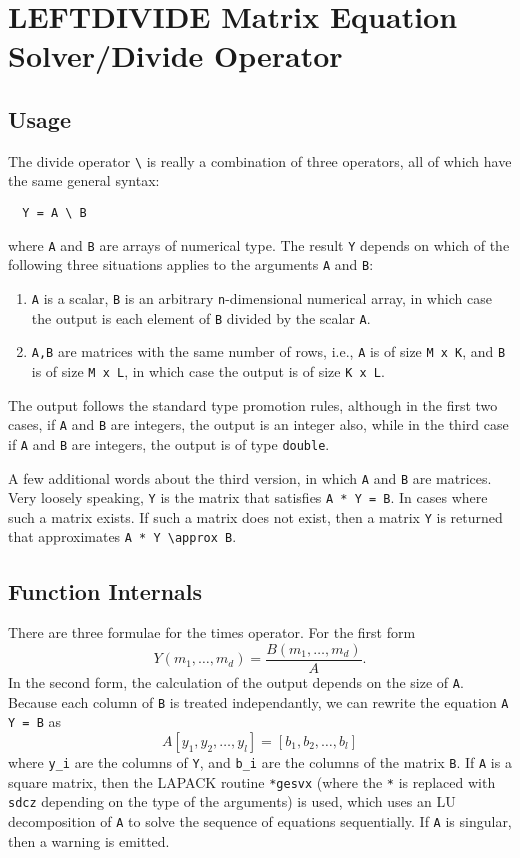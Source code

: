 \section{LEFTDIVIDE Matrix Equation Solver/Divide Operator}

\subsection{Usage}

The divide operator \verb|\| is really a combination of three
operators, all of which have the same general syntax:
\begin{verbatim}
  Y = A \ B
\end{verbatim}
where \verb|A| and \verb|B| are arrays of numerical type.  The result \verb|Y| depends
on which of the following three situations applies to the arguments
\verb|A| and \verb|B|:
\begin{enumerate}
\item  \verb|A| is a scalar, \verb|B| is an arbitrary \verb|n|-dimensional numerical array, in which case the output is each element of \verb|B| divided by the scalar \verb|A|.

\item  \verb|A,B| are matrices with the same number of rows, i.e., \verb|A| is of size \verb|M x K|, and \verb|B| is of size \verb|M x L|, in which case the output is of size \verb|K x L|.

\end{enumerate}
The output follows the standard type promotion rules, although in the first two cases, if \verb|A| and \verb|B| are integers, the output is an integer also, while in the third case if \verb|A| and \verb|B| are integers, the output is of type \verb|double|.

A few additional words about the third version, in which \verb|A| and \verb|B| are matrices.  Very loosely speaking, \verb|Y| is the matrix that satisfies \verb|A * Y = B|.  In cases where such a matrix exists.  If such a matrix does not exist, then a matrix \verb|Y| is returned that approximates \verb|A * Y \approx B|.
\subsection{Function Internals}

There are three formulae for the times operator.  For the first form
\[
Y(m_1,\ldots,m_d) = \frac{B(m_1,\ldots,m_d)}{A}.
\]
In the second form, the calculation of the output depends on the size of \verb|A|. Because each column of \verb|B| is treated independantly, we can rewrite the equation \verb|A Y = B| as
\[
  A [y_1, y_2,\ldots, y_l] = [b_1, b_2, \ldots, b_l]
\]
where \verb|y_i| are the columns of \verb|Y|, and \verb|b_i| are the columns of the matrix \verb|B|. If \verb|A| is a square matrix, then the LAPACK routine \verb|*gesvx| (where the \verb|*| is replaced with \verb|sdcz| depending on the type of the arguments) is used, which uses an LU decomposition of \verb|A| to solve the sequence of equations sequentially.  If \verb|A| is singular, then a warning is emitted. 

